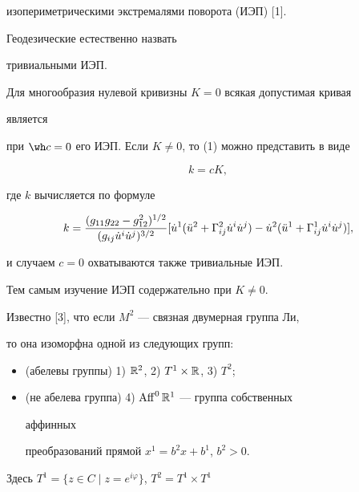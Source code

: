 изопериметрическими экстремалями поворота (ИЭП) [1]. 


Геодезические естественно назвать 


тривиальными ИЭП. 


 


Для многообразия нулевой кривизны $K=0$ всякая допустимая кривая 


является 


при $\wh c=0$ его ИЭП. Если $K\ne0$, то (1) можно представить в виде 


\begin{equation} 


k=c K,\tag{$1'$} 


\end{equation} 


где $k$ вычисляется по формуле 


$$ 


k=\frac{(g_{11}g_{22}-g^2_{12})^{1/2}} 


{(g_{i j}\Dot u^i\Dot u^j)^{3/2}}[\Dot u^1(\Ddot u^2+ 


\Gamma^2_{i j}\Dot u^i\Dot u^j)- 


\Dot u^2(\Ddot u^1+\Gamma^1_{i j} 


\Dot u^i\Dot u^j)], 


$$ 


и случаем $c=0$ охватываются также тривиальные ИЭП. 


Тем самым изучение ИЭП содержательно при $K\ne0$. 


 


Известно [3], что если $M^2$ --- связная двумерная группа Ли, 


то она изоморфна одной из следующих групп: 


\begin{itemize} 


\item[I] (абелевы группы) 1) $\Bbb R^2$, 2) $T^1\times\Bbb R$, 3) $T^2$; 


\item[II] (не абелева группа) 4) $\operatorname{Aff}^0\Bbb R^1$ --- группа собственных 


аффинных 


преобразований прямой $x^1=b^2x+b^1$, $b^2>0$. 


\end{itemize} 


\noindent{}Здесь $T^1=\{z\in C\mid z=e^{i\varphi}\}$, $T^2=T^1\times T^1$


